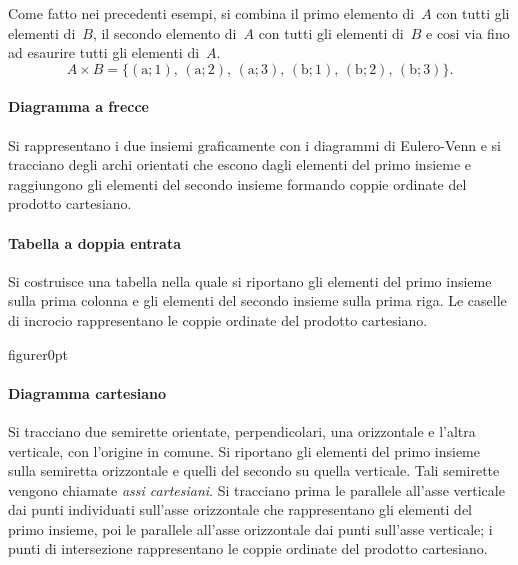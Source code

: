 Come fatto nei precedenti esempi, si combina il primo elemento
di~$A$ con tutti gli elementi di~$B$, il secondo elemento
di~$A$ con tutti gli elementi di~$B$ e cosi via fino ad
esaurire tutti gli elementi di~$A$.
\[A\times B=\{(\text{a};1)\text{, }(\text{a};2)\text{, }(\text{a};3)\text{, }(\text{b};1)\text{, }(\text{b};2)\text{, }(\text{b};3)\}.\]

\paragraph{Diagramma a frecce}
Si rappresentano i due insiemi graficamente
con i diagrammi di Eulero-Venn e si tracciano degli archi orientati che
escono dagli elementi del primo insieme e raggiungono gli elementi del
secondo insieme formando coppie ordinate del prodotto cartesiano.
\begin{center}

\end{center}

\paragraph{Tabella a doppia entrata}

Si costruisce una tabella nella quale si riportano gli elementi del
primo insieme sulla prima colonna e gli elementi del secondo insieme
sulla prima riga. Le caselle di incrocio rappresentano le coppie
ordinate del prodotto cartesiano.
\begin{center}
 
\end{center}

\begin{wrapfloat}{figure}{r}{0pt}
 
\end{wrapfloat}

\paragraph{Diagramma cartesiano}
Si tracciano due semirette orientate, perpendicolari, una orizzontale e l'altra
verticale, con l'origine
in comune. Si riportano gli elementi del primo insieme sulla semiretta
orizzontale e quelli del secondo su quella verticale. Tali semirette
vengono chiamate \emph{assi cartesiani}. Si tracciano prima le
parallele all'asse verticale dai punti individuati
sull'asse orizzontale che rappresentano gli elementi
del primo insieme, poi le parallele all'asse
orizzontale dai punti sull'asse verticale; i punti di
intersezione rappresentano le coppie ordinate del prodotto
cartesiano.

